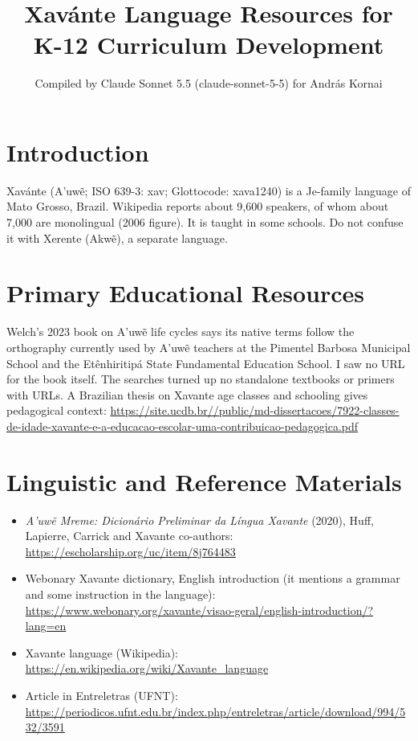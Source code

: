 \documentclass[12pt]{article}
\title{Xav\'ante Language Resources for K-12 Curriculum Development}
\author{Compiled by Claude Sonnet 5.5 (claude-sonnet-5-5) for Andr\'as Kornai}
\date{}
\begin{document}
\maketitle

\section{Introduction}
Xav\'ante (A'uw\~e; ISO 639-3: xav; Glottocode: xava1240) is a Je-family language of Mato Grosso, Brazil. Wikipedia reports about 9,600 speakers, of whom about 7,000 are monolingual (2006 figure). It is taught in some schools. Do not confuse it with Xerente (Akw\~e), a separate language.

\section{Primary Educational Resources}
Welch's 2023 book on A'uw\~e life cycles says its native terms follow the orthography currently used by A'uw\~e teachers at the Pimentel Barbosa Municipal School and the Etênhiritip\'a State Fundamental Education School. I saw no URL for the book itself. The searches turned up no standalone textbooks or primers with URLs. A Brazilian thesis on Xavante age classes and schooling gives pedagogical context: \url{https://site.ucdb.br//public/md-dissertacoes/7922-classes-de-idade-xavante-e-a-educacao-escolar-uma-contribuicao-pedagogica.pdf}

\section{Linguistic and Reference Materials}
\begin{itemize}
\item \emph{A'uw\~e Mreme: Dicion\'ario Preliminar da L\'ingua Xavante} (2020), Huff, Lapierre, Carrick and Xavante co-authors: \url{https://escholarship.org/uc/item/8j764483}
\item Webonary Xavante dictionary, English introduction (it mentions a grammar and some instruction in the language): \url{https://www.webonary.org/xavante/visao-geral/english-introduction/?lang=en}
\item Xavante language (Wikipedia): \url{https://en.wikipedia.org/wiki/Xavante_language}
\item Article in Entreletras (UFNT): \url{https://periodicos.ufnt.edu.br/index.php/entreletras/article/download/994/532/3591}
\end{itemize}
\end{document}
